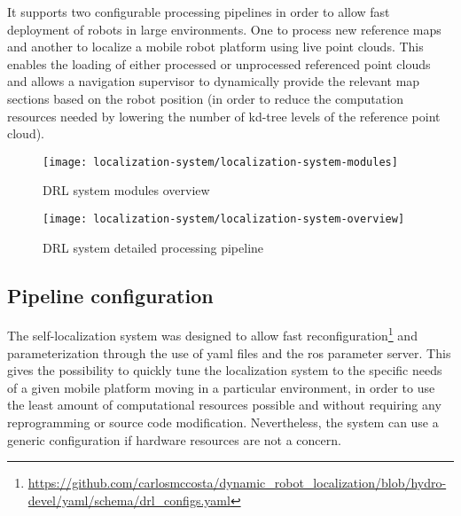 It supports two configurable processing pipelines in order to allow fast deployment of robots in large environments. One to process new reference maps and another to localize a mobile robot platform using live point clouds. This enables the loading of either processed or unprocessed referenced point clouds and allows a navigation supervisor to dynamically provide the relevant map sections based on the robot position (in order to reduce the computation resources needed by lowering the number of kd-tree levels of the reference point cloud).

\begin{figure}[h]
	\centering
	\texttt{[image: localization-system/localization-system-modules]}
	\caption{DRL system modules overview}
	\label{fig:localization-system_localization-system-brief-overview}
\end{figure}

\begin{figure}[h]
	\centering
	\texttt{[image: localization-system/localization-system-overview]}
	\caption{DRL system detailed processing pipeline}
	\label{fig:localization-system_localization-system-overview}
\end{figure}


\subsection{Pipeline configuration}

The self-localization system was designed to allow fast reconfiguration\footnote{\url{https://github.com/carlosmccosta/dynamic_robot_localization/blob/hydro-devel/yaml/schema/drl_configs.yaml}} and parameterization through the use of yaml files and the \gls{ros} parameter server. This gives the possibility to quickly tune the localization system to the specific needs of a given mobile platform moving in a particular environment, in order to use the least amount of computational resources possible and without requiring any reprogramming or source code modification. Nevertheless, the system can use a generic configuration if hardware resources are not a concern.

